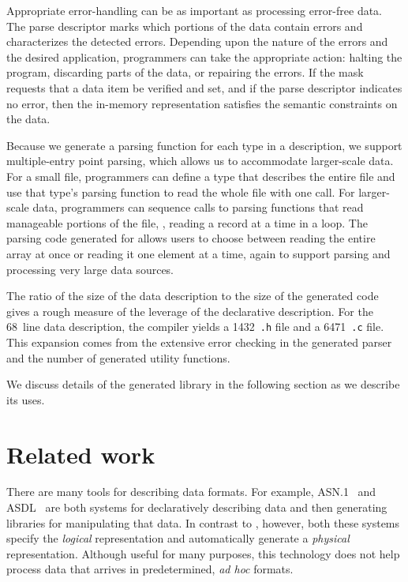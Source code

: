 Appropriate error-handling can be as important as processing
error-free data.  The parse descriptor marks which portions of the
data contain errors and characterizes the detected errors.
Depending upon the nature of the errors and the desired application,
programmers can take the appropriate action: halting the program,
discarding parts of the data, or repairing the errors.
If the mask requests
that a data item be verified and set, and if the parse descriptor
indicates no error, then the in-memory representation satisfies the
semantic constraints on the data.

Because we generate a parsing function for each type in a \pads{} description,
we support multiple-entry point parsing, which allows us to 
accommodate larger-scale data.
For a small file, programmers can define a \pads{} type that describes
the entire file and use that type's parsing function to read the whole
file with one call.  For larger-scale data, programmers can sequence
calls to parsing functions that read manageable portions of the file,
\eg{}, reading a record at a time in a loop.  The parsing code generated
for  allows users to choose between reading the entire array
at once or reading it one element at a time, again to support parsing
and processing very large data sources.

The ratio of the size of the data description to the size of the generated code gives a rough measure of the leverage of the
declarative description.  For the 
68~line \dibbler{} data description, the compiler yields a 1432~\texttt{.h} file
and a 6471~\texttt{.c} file.  This expansion comes from the extensive error checking in the generated parser and the number of generated utility functions.

We discuss details of the generated library in the following section
as we describe its uses.

\section{Related work}
There are many tools for describing data formats. For example,
\textsc{ASN.1}~\cite{asn} and \textsc{ASDL}~\cite{asdl} are both
systems for declaratively describing data and then generating
libraries for manipulating that data.  In contrast to \PADS{},
however, both these systems specify the {\em logical\/} representation
and automatically generate a {\em physical\/} representation.
Although useful for many purposes, this technology does not help
process data that arrives in predetermined, \textit{ad hoc} formats.


